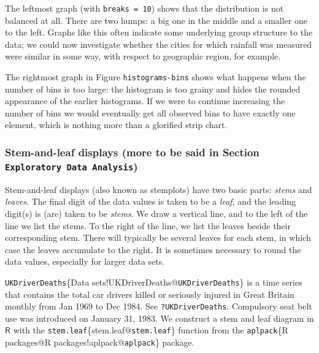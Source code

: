 \documentclass[10pt,english]{scrbook}
\begin{document}
\begin{exampletoo}
The leftmost graph (with \texttt{breaks = 10}) shows that the distribution is not balanced at all. There are two humps: a big one in the middle and a smaller one to the left. Graphs like this often indicate some underlying group structure to the data; we could now investigate whether the cities for which rainfall was measured were similar in some way, with respect to geographic region, for example.

The rightmost graph in Figure \texttt{histograms-bins} shows what happens when the number of bins is too large: the histogram is too grainy and hides the rounded appearance of the earlier histograms. If we were to continue increasing the number of bins we would eventually get all observed bins to have exactly one element, which is nothing more than a glorified strip chart.

\end{exampletoo}

\subsubsection[Stem-and-leaf displays (more to be said in Section \texttt{Exploratory Data Analysis})]{Stem-and-leaf displays (more to be said in Section \texttt{Exploratory Data Analysis})}
\label{sec-1-1-2-3}

Stem-and-leaf displays (also known as stemplots) have two basic parts: \emph{stems} and \emph{leaves}. The final digit of the data values is taken to be a \emph{leaf}, and the leading digit(s) is (are) taken to be \emph{stems}. We draw a vertical line, and to the left of the line we list the stems. To the right of the line, we list the leaves beside their corresponding stem. There will typically be several leaves for each stem, in which case the leaves accumulate to the right. It is sometimes necessary to round the data values, especially for larger data sets.

\begin{exampletoo}

\texttt{UKDriverDeaths}\index\{Data sets!UKDriverDeaths@\texttt{UKDriverDeaths}\} is a time series that contains the total car drivers killed or seriously injured in Great Britain monthly from Jan 1969 to Dec 1984. See \texttt{?UKDriverDeaths}. Compulsory seat belt use was introduced on January 31, 1983. We construct a stem and leaf diagram in \(\mathsf{R}\) with the \texttt{stem.leaf}\index\{stem.leaf@\texttt{stem.leaf}\} function from the \texttt{aplpack}\index\{R packages@\textsf{R} packages!aplpack@\texttt{aplpack}\} package\cite{aplpack}.
\end{exampletoo}
\end{document}
